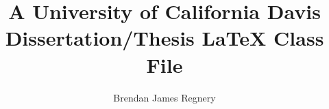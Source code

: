 \documentclass[12pt,draftcls]{ucdavisthesis}
\title          {A University of California Davis\\
                 Dissertation/Thesis LaTeX Class File}
\author         {Brendan James Regnery}
\begin{document}
\newcommand{\bibfont}{\singlespacing}



\makeintropages %



%



\end{document}
